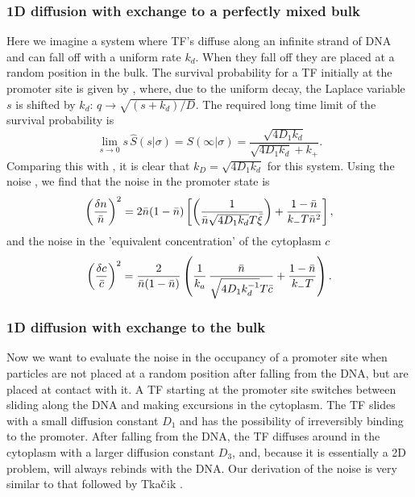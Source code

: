 \subsubsection{1D diffusion with exchange to a perfectly mixed bulk}
Here we imagine a system where TF's diffuse along an infinite strand of DNA and can fall off with a uniform rate $k_d$. When they fall off they are placed at a random position in the bulk. The survival probability for a TF initially at the promoter site is given by , where, due to the uniform decay, the Laplace variable $s$ is shifted by $k_d$: $q \to \sqrt{(s+k_d)/D}$. The required long time limit of the survival probability is
\begin{equation}
 \lim_{s\to0} s \, \hat{S}(s|\sigma) = S(\infty|\sigma) = \frac{\sqrt{4 D_1 k_d}}{\sqrt{4 D_1 k_d} + k_+}.
\end{equation}
Comparing this with , it is clear that $k_D = \sqrt{4 D_1 k_d}$ for this system. Using the noise , we find that the noise in the promoter state is
\begin{equation}
 \elabel{NoiseProWM}
 \left( \frac{\delta n}{\bar{n}} \right)^2 = 2 \bar{n}(1-\bar{n})\left[\left( \frac{1}{\bar{n} \sqrt{4 D_1 k_d} T \bar{\xi}} \right)+\frac{1-\bar{n}}{k_- T \bar{n}^2} \right],
\end{equation}
and the noise in the 'equivalent concentration' of the cytoplasm $c$
\begin{equation}
 \elabel{NoiseCWM} 
 \left( \frac{\delta c}{\bar{c}} \right)^2 = \frac{2}{\bar{n}(1-\bar{n})} \left( \frac{1}{k_a} \, \frac{\bar{n}}{\sqrt{4 D_1 k_d^{-1}} T \bar{c}} + \frac{1-\bar{n}}{k_- T}  \right).
\end{equation}


\subsubsection{1D diffusion with exchange to the bulk}
Now we want to evaluate the noise in the occupancy of a promoter site when particles are not placed at a random position after falling from the DNA, but are placed at contact with it. A TF starting at the promoter site switches between sliding along the DNA and making excursions in the cytoplasm. The TF slides with a small diffusion constant $D_1$ and has the possibility of irreversibly binding to the promoter. After falling from the DNA, the TF diffuses around in the cytoplasm with a larger diffusion constant $D_3$, and, because it is essentially a 2D problem, will always rebinds with the DNA. Our derivation of the noise is very similar to that followed by Tka$\check{\rm c}$ik \cite{Tkacik2009}.

